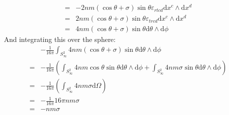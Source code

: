 \documentclass[12pt,a4]{article}
\newcommand{\e}{\mathrm{d}}
\begin{document}
\begin{enumerate}
\begin{enumerate}
\begin{align*}
          = & - 2 nm (\cos \theta + \sigma) \sin \theta \varepsilon_{rtcd} \e x^c \wedge \e x^d \\
          = & 2 nm (\cos \theta + \sigma) \sin \theta \varepsilon_{trcd} \e x^c \wedge \e x^d\\
          = & 4 nm (\cos \theta + \sigma) \sin \theta  \e \theta \wedge \e \phi
        \end{align*}
        And integrating this over the sphere:
        \begin{align*}
            & -\frac{1}{16 \pi}\int_{S^2_\infty} 4 nm (\cos \theta + \sigma) \sin \theta  \e \theta \wedge \e \phi\\
          = & -\frac{1}{16 \pi}\left(\int_{S^2_\infty} 4 nm \cos \theta \sin \theta  \e \theta \wedge \e \phi + \int_{S^2_\infty} 4 nm \sigma \sin \theta  \e \theta \wedge \e \phi\right)\\
          = & -\frac{1}{16 \pi}\left(\int_{S^2_\infty} 4 nm \sigma \e \Omega\right)\\
          = & -\frac{1}{16 \pi}16 \pi nm \sigma \\
          = & - nm \sigma 
        \end{align*}
    \end{enumerate}
\end{enumerate}

\end{document}
